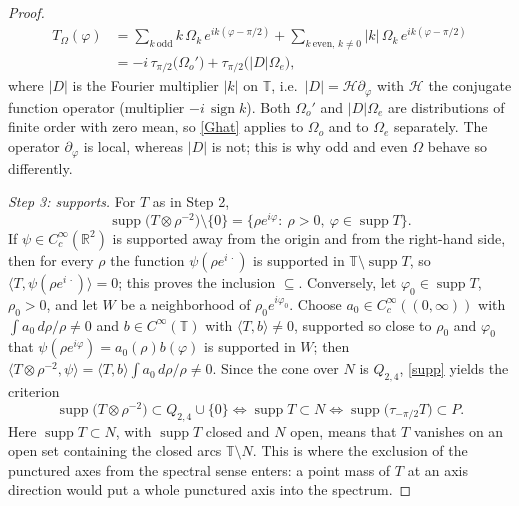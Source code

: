 \documentclass{article}
\newcommand{\tmop}[1]{\ensuremath{\operatorname{#1}}}
\def\R{{\mathbb R}}
\def\T{{\mathbb T}}
\begin{document}
\begin{proof}
		\begin{equation}\label{TOmega}
			\begin{aligned}
			T_\Omega(\varphi)&=\sum_{k\ \mathrm{odd}}k\,\Omega_k\,e^{ik(\varphi-\pi/2)}+\sum_{k\ \mathrm{even},\,k\neq0}|k|\,\Omega_k\,e^{ik(\varphi-\pi/2)}\\
			&=-i\,\tau_{\pi/2}\big(\Omega_o'\big)+\tau_{\pi/2}\big(|D|\Omega_e\big),
			\end{aligned}
		\end{equation}
		where $|D|$ is the Fourier multiplier $|k|$ on $\T$, i.e.\ $|D|=\mathcal H\partial_\varphi$ with $\mathcal H$ the conjugate function operator (multiplier $-i\,\tmop{sign}k$). Both $\Omega_o'$ and $|D|\Omega_e$ are distributions of finite order with zero mean, so \eqref{Ghat} applies to $\Omega_o$ and to $\Omega_e$ separately. The operator $\partial_\varphi$ is local, whereas $|D|$ is not; this is why odd and even $\Omega$ behave so differently.

		\emph{Step 3: supports.} For $T$ as in Step 2,
		\begin{equation}\label{supp}
			\tmop{supp}\big(T\otimes\rho^{-2}\big)\setminus\{0\}=\{\rho e^{i\varphi}:\ \rho>0,\ \varphi\in\tmop{supp}T\}.
		\end{equation}
		If $\psi\in C_c^\infty(\R^2)$ is supported away from the origin and from the right-hand side, then for every $\rho$ the function $\psi(\rho e^{i\,\cdot})$ is supported in $\T\setminus\tmop{supp}T$, so $\langle T,\psi(\rho e^{i\,\cdot})\rangle=0$; this proves the inclusion $\subseteq$. Conversely, let $\varphi_0\in\tmop{supp}T$, $\rho_0>0$, and let $W$ be a neighborhood of $\rho_0e^{i\varphi_0}$. Choose $a_0\in C_c^\infty((0,\infty))$ with $\int a_0\,d\rho/\rho\neq0$ and $b\in C^\infty(\T)$ with $\langle T,b\rangle\neq0$, supported so close to $\rho_0$ and $\varphi_0$ that $\psi(\rho e^{i\varphi})=a_0(\rho)b(\varphi)$ is supported in $W$; then $\langle T\otimes\rho^{-2},\psi\rangle=\langle T,b\rangle\int a_0\,d\rho/\rho\neq0$. Since the cone over $N$ is $Q_{2,4}$, \eqref{supp} yields the criterion
		\begin{equation}\label{crit}
			\tmop{supp}\big(T\otimes\rho^{-2}\big)\subset Q_{2,4}\cup\{0\}\iff\tmop{supp}T\subset N\iff\tmop{supp}\big(\tau_{-\pi/2}T\big)\subset P .
		\end{equation}
		Here $\tmop{supp}T\subset N$, with $\tmop{supp}T$ closed and $N$ open, means that $T$ vanishes on an open set containing the closed arcs $\T\setminus N$. This is where the exclusion of the punctured axes from the spectral sense enters: a point mass of $T$ at an axis direction would put a whole punctured axis into the spectrum.


\end{proof}
\end{document}
